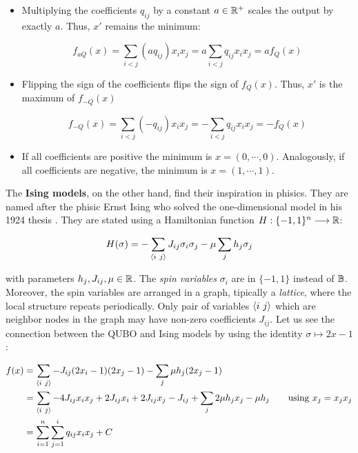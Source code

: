 \begin{itemize}
	\item Multiplying the coefficients $q_{ij}$ by a constant $a \in \mathbb{R}^+$ scales the output by exactly $a$. Thus, $x'$ remains the minimum:
	
		$$ f_{aQ}(x) = \sum_{i<j} (a q_{ij}) x_i x_j  = a \sum_{i<j} q_{ij} x_i x_j = a f_Q(x) $$
		
	\item Flipping the sign of the coefficients flips the sign of $f_Q(x)$. Thus, $x'$ is the maximum of $f_{-Q}(x)$
	
		$$ f_{-Q}(x) = \sum_{i<j} (-q_{ij}) x_i x_j  = - \sum_{i<j} q_{ij} x_i x_j = -f_Q(x) $$
		
	\item If all coefficients are positive the minimum is $x = (0, \cdots, 0)$. Analogously, if all coefficients are negative, the minimum is $x = (1, \cdots, 1)$. 
\end{itemize}

The \textbf{Ising models}, on the other hand, find their inspiration in phisics. They are named after the phisic Ernst Ising who solved the one-dimensional model in his 1924 thesis \cite{Ising1924}. They are stated using a Hamiltonian function $H: \{-1, 1\}^n \longrightarrow \mathbb{R}$:

$$ H(\sigma) = - \sum_{\langle i ~ j \rangle} J_{ij} \sigma_i \sigma_j - \mu \sum_j h_j \sigma_j $$

with parameters $h_j, J_{ij}, \mu \in \mathbb{R}$. The \emph{spin variables} $\sigma_i$ are in $\{-1, 1\}$ instead of $\mathbb{B}$. Moreover, the spin variables are arranged in a graph, tipically a \emph{lattice}, where the local structure repeats periodically. Only pair of variables $\langle i ~ j \rangle$ which are neighbor nodes in the graph may have non-zero coefficients $J_{ij}$. Let us see the connection between the QUBO and Ising models by using the identity $\sigma \mapsto 2x -1$:

\begin{equation*}
	\begin{split}
		f(x)	& = \sum_{\langle i ~ j \rangle} - J_{ij} (2x_i - 1) (2x_j - 1) - \sum_j \mu h_j (2x_j - 1) \\
				& = \sum_{\langle i ~ j \rangle} - 4J_{ij} x_i x_j + 2J_{ij} x_i + 2J_{ij} x_j - J_{ij} + \sum_j 2 \mu h_j x_j - \mu h_j \qquad \text{using }  x_j = x_jx_j \\
				& = \sum_{i=1}^n \sum_{j=1}^i q_{ij} x_i x_j + C
	\end{split}
\end{equation*}

